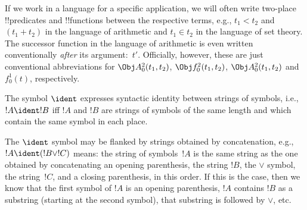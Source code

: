 \documentclass[../../include/open-logic-section]{subfiles}
\begin{document}
If we work in a language for a specific application, we will often
write two-place !!{predicate}s and !!{function}s between the
respective terms, e.g., $t_1 < t_2$ and $(t_1 + t_2)$ in the language
of arithmetic and $t_1 \in t_2$ in the language of set theory.  The
successor function in the language of arithmetic is even written
conventionally \emph{after} its argument:~$t'$.  Officially, however,
these are just conventional abbreviations for $\Obj A^2_0(t_1, t_2)$,
$\Obj f^2_0(t_1, t_2)$, $\Obj A^2_0(t_1, t_2)$ and $f^1_0(t)$,
respectively.

\begin{defn}
The symbol $\ident$ expresses syntactic identity between strings of
symbols, i.e., $!A \ident !B$ iff $!A$ and $!B$ are strings of symbols
of the same length and which contain the same symbol in each place.
\end{defn}

The $\ident$ symbol may be flanked by strings obtained by
concatenation, e.g., $!A \ident (!B \lor !C)$ means: the string of
symbols~$!A$ is the same string as the one obtained by concatenating
an opening parenthesis, the string $!B$, the $\lor$ symbol, the
string~$!C$, and a closing parenthesis, in this order. If this is the
case, then we know that the first symbol of $!A$ is an opening
parenthesis, $!A$ contains $!B$ as a substring (starting at the second
symbol), that substring is followed by $\lor$, etc.
\end{document}
